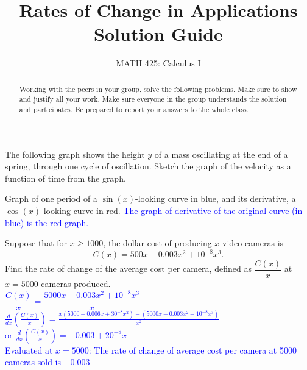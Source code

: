 \documentclass{ximera}
\title{Rates of Change in Applications Solution Guide}
\author{MATH 425: Calculus I}
\begin{document}
\begin{abstract}
    Working with the peers in your group, solve the following problems. Make sure to show and justify all your work. Make sure everyone in the group understands the solution and participates. Be prepared to report your answers to the whole class. 
\end{abstract}
\maketitle


\begin{exercise}
    The following graph shows the height $y$ of a mass oscillating at the end of a spring, through one cycle of oscillation.  Sketch the graph of the velocity as a function of time from the graph.
    \begin{image}
    \end{image}
    \xmalt Graph of one period of a $\sin(x)$-looking curve in blue, and its derivative, a $\cos(x)$-looking curve in red.
    \textcolor{blue}{The graph of derivative of the original curve (in blue) is the red graph.}
\end{exercise}

\begin{exercise}
    Suppose that for $x\geq 1000$, the dollar cost of producing $x$ video cameras is $$C(x)=500x-0.003x^2+10^{-8}x^3.$$  Find the rate of change of the average cost per camera, defined as $\dfrac{C(x)}{x}$ at $x=5000$ cameras produced.\\
    \textcolor{blue}{$\dfrac{C(x)}{x}=\dfrac{5000x-0.003x^2+10^{-8}x^3}{x}$\\
    $\displaystyle \frac{d}{dx}(\frac{C(x)}{x})=\frac{x(5000-0.006x+30^{-8}x^2)-(5000x-0.003x^2+10^{-8}x^3)}{x^2}$\\
    or $\displaystyle \frac{d}{dx}(\frac{C(x)}{x})=-0.003+20^{-8}x$\\
    Evaluated at $x=5000$: The rate of change of average cost per camera at 5000 cameras sold is $-0.003$}
\end{exercise}
\end{document}
